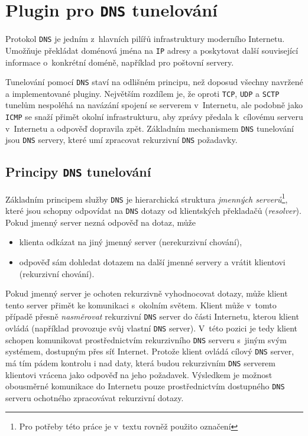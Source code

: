 \documentclass[thesis=M,czech]{FITthesis}[2012/10/20]
\begin{document}
    \clearpage
    
\section{Plugin pro \texttt{DNS} tunelování}
\label{sec:dns-tunnel}
    
    Protokol \texttt{DNS} je jedním z~hlavních pilířů infrastruktury moderního Internetu. Umožňuje překládat doménová jména na \texttt{IP} adresy a poskytovat další související informace o~konkrétní doméně, například pro poštovní servery.
    
    Tunelování pomocí \texttt{DNS} staví na odlišném principu, než doposud všechny navržené a implementované pluginy. Největším rozdílem je, že oproti \texttt{TCP}, \texttt{UDP} a \texttt{SCTP} tunelům nespoléhá na navázání spojení se serverem v~Internetu, ale podobně jako \texttt{ICMP} se snaží přimět okolní infrastrukturu, aby zprávy předala k~cílovému serveru v~Internetu a odpověď dopravila zpět. Základním mechanismem \texttt{DNS} tunelování jsou \texttt{DNS} servery, které umí zpracovat rekurzivní \texttt{DNS} požadavky.
    
    \subsection{Principy \texttt{DNS} tunelování}
    
    Základním principem služby \texttt{DNS} je hierarchická struktura \textit{jmenných serverů}\footnote{Pro potřeby této práce je v~textu rovněž použito označení }, které jsou schopny odpovídat na \texttt{DNS} dotazy od klientských překladačů (\textit{resolver}). Pokud jmenný server nezná odpověď na dotaz, může
    
    \begin{itemize}
     \item klienta odkázat na jiný jmenný server (nerekurzivní chování),
     \item odpověď sám dohledat dotazem na další jmenné servery a vrátit klientovi (rekurzivní chování).
    \end{itemize}
    
    Pokud jmenný server je ochoten rekurzivně vyhodnocovat dotazy, může klient tento server přimět ke komunikaci s~okolním světem. Klient může v~tomto případě přesně \textit{nasměrovat} rekurzivní \texttt{DNS} server do části Internetu, kterou klient ovládá (například provozuje svůj vlastní \texttt{DNS} server). V~této pozici je tedy klient schopen komunikovat prostřednictvím rekurzivního \texttt{DNS} serveru s~jiným svým systémem, dostupným přes síť Internet. Protože klient ovládá cílový \texttt{DNS} server, má tím pádem kontrolu i nad daty, která budou rekurzivním \texttt{DNS} serverem klientovi vrácena jako odpověď na jeho požadavek. Výsledkem je možnost obousměrné komunikace do Internetu pouze prostřednictvím dostupného \texttt{DNS} serveru ochotného zpracovávat rekurzivní dotazy.
\end{document}
